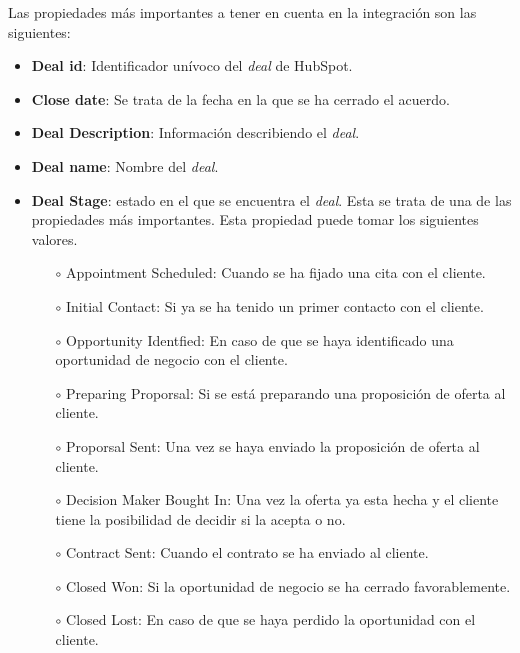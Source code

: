 		Las propiedades más importantes a tener en cuenta en la integración son las siguientes:
		\begin{itemize}
			\item \textbf{Deal id}: Identificador unívoco del \textit{deal} de HubSpot.
			\item \textbf{Close date}: Se trata de la fecha en la que se ha cerrado el acuerdo.
			\item \textbf{Deal Description}: Información describiendo el \textit{deal}.
			\item \textbf{Deal name}: Nombre del \textit{deal}.
			\item \textbf{Deal Stage}: estado en el que se encuentra el \textit{deal}. Esta se trata de una de las propiedades más importantes. 
				Esta propiedad puede tomar los siguientes valores.
				\begin{itemize}
					\item[$\circ$] Appointment Scheduled: Cuando se ha fijado una cita con el cliente.
					\item[$\circ$] Initial Contact: Si ya se ha tenido un primer contacto con el cliente.
					\item[$\circ$] Opportunity Identfied: En caso de que se haya identificado una oportunidad de negocio con el cliente.
					\item[$\circ$] Preparing Proporsal: Si se está preparando una proposición de oferta al cliente.
					\item[$\circ$] Proporsal Sent: Una vez se haya enviado la proposición de oferta al cliente.
					\item[$\circ$] Decision Maker Bought In: Una vez la oferta ya esta hecha y el cliente tiene la posibilidad de decidir si la acepta o no.
					\item[$\circ$] Contract Sent: Cuando el contrato se ha enviado al cliente.
					\item[$\circ$] Closed Won: Si la oportunidad de negocio se ha cerrado favorablemente.
					\item[$\circ$] Closed Lost: En caso de que se haya perdido la oportunidad con el cliente.
				\end{itemize}
		\end{itemize}
		
